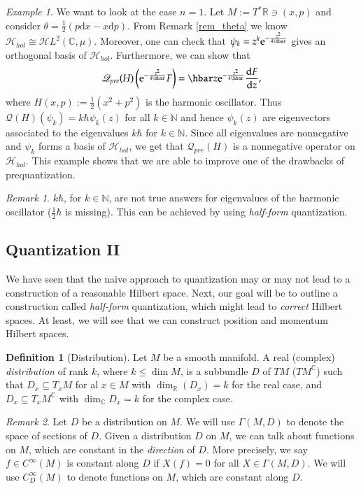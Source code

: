 \documentclass[11pt]{amsart}
\numberwithin{equation}{section}
\theoremstyle{plain}
\theoremstyle{definition}
\newtheorem{defn}{Definition}[subsection]
\theoremstyle{remark}
\newtheorem{rem}{Remark}[subsection]
\newtheorem{ex}{Example}[subsection]
\newcommand{\R}{\mathbb{R}}
\newcommand{\N}{\mathbb{N}}
\newcommand{\dd}{{\mathrm{d}}}
\newcommand{\calH}{\mathcal{H}}
\newcommand{\ee}{\textnormal{e}}
\begin{document}
\begin{ex}
We want to look at the case $n=1$. Let $M:=T^*\R\ni (x,p)$ and consider $\theta=\frac{1}{2}(p\dd x-x\dd p)$. From Remark \ref{rem_theta} we know $\calH_{hol}\cong \mathscr{H}L^2(\mathbb{C},\mu)$. Moreover, one can check that $\psi_k=z^k\ee^{-\frac{z^2}{4\hbar}}$ gives an orthogonal basis of $\calH_{hol}$. Furthermore, we can show that $$\mathscr{Q}_{pre}(H)\left(\ee^{-\frac{z^2}{4\hbar}}F\right)=\hbar z\ee^{-\frac{z^2}{4\hbar}}\frac{\dd F}{\dd z},$$
where $H(x,p):=\frac{1}{2}(x^2+p^2)$ is the harmonic oscillator. Thus $\mathscr{Q}(H)(\psi_k)=k\hbar\psi_k(z)$ for all $k\in\N$ and hence $\psi_k(z)$ are eigenvectors associated to the eigenvalues $k\hbar$ for $k\in\N$. Since all eigenvalues are nonnegative and $\psi_k$ forms a basis of $\calH_{hol}$, we get that $\mathscr{Q}_{pre}(H)$ is a nonnegative operator on $\calH_{hol}$. This example shows that we are able to improve one of the drawbacks of prequantization.
\end{ex}

\begin{rem}
$k\hbar$, for $k\in\N$, are not true answers for eigenvalues of the harmonic oscillator ($\frac{1}{2}\hbar$ is missing). This can be achieved by using \emph{half-form} quantization.
\end{rem}

\subsection{Quantization II}
We have seen that the naive approach to quantization may or may not lead to a construction of a reasonable Hilbert space. Next, our goal will be to outline a construction called \emph{half-form} quantization, which might lead to \emph{correct} Hilbert spaces. At least, we will see that we can construct position and momentum Hilbert spaces. 

\begin{defn}[Distribution]
Let $M$ be a smooth manifold. A real (complex) \emph{distribution} of rank $k$, where $k\leq \dim M$, is a subbundle $D$ of $TM$ ($TM^\mathbb{C}$) such that $D_x\subseteq T_xM$ for al $x\in M$ with $\dim_\R(D_x)=k$ for the real case, and $D_x\subseteq T_xM^\mathbb{C}$ with $\dim_\mathbb{C}D_x=k$ for the complex case.
\end{defn}

\begin{rem}
Let $D$ be a distribution on $M$. We will use $\Gamma(M,D)$ to denote the space of sections of $D$. Given a distribution $D$ on $M$, we can talk about functions on $M$, which are constant in the \emph{direction} of $D$. More precisely, we say $f\in C^\infty(M)$ is constant along $D$ if $X(f)=0$ for all $X\in \Gamma(M,D)$. We will use $C^\infty_D(M)$ to denote functions on $M$, which are constant along $D$.
\end{rem}
\end{document}
